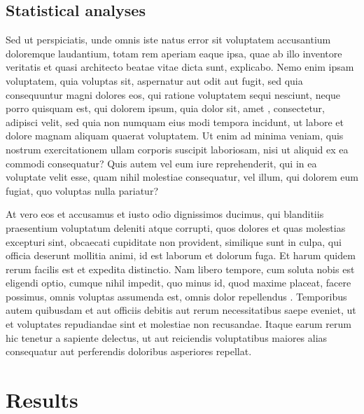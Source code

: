 \documentclass[a4paper,11pt,twoside]{article}
\begin{document}
\subsection*{Statistical analyses}

Sed ut perspiciatis, unde omnis iste natus error sit voluptatem accusantium
doloremque laudantium, totam rem aperiam eaque ipsa, quae ab illo inventore
veritatis et quasi architecto beatae vitae dicta sunt, explicabo. Nemo enim
ipsam voluptatem, quia voluptas sit, aspernatur aut odit aut fugit, sed quia
consequuntur magni dolores eos, qui ratione voluptatem sequi nesciunt, neque
porro quisquam est, qui dolorem ipsum, quia dolor sit, amet
\citep{Ray_2005_Bk,Looijen_1998_PhD}, consectetur, adipisci velit, sed quia non
numquam eius modi tempora incidunt, ut labore et dolore magnam aliquam quaerat
voluptatem. Ut enim ad minima veniam, quis nostrum exercitationem ullam corporis
suscipit laboriosam, nisi ut aliquid ex ea commodi consequatur? Quis autem vel
eum iure reprehenderit, qui in ea voluptate velit esse, quam nihil molestiae
consequatur, vel illum, qui dolorem eum fugiat, quo voluptas nulla pariatur?

At vero eos et accusamus et iusto odio dignissimos ducimus, qui blanditiis praesentium
voluptatum deleniti atque corrupti, quos dolores et quas molestias excepturi sint,
obcaecati cupiditate non provident, similique sunt in culpa, qui officia deserunt mollitia
animi, id est laborum et dolorum fuga. Et harum quidem rerum facilis est et expedita
distinctio. Nam libero tempore, cum soluta nobis est eligendi optio, cumque nihil impedit,
quo minus id, quod maxime placeat, facere possimus, omnis voluptas assumenda est, omnis
dolor repellendus \citep{Gibeau_1998}. Temporibus autem quibusdam et aut officiis debitis
aut rerum necessitatibus saepe eveniet, ut et voluptates repudiandae sint et molestiae non
recusandae. Itaque earum rerum hic tenetur a sapiente delectus, ut aut reiciendis
voluptatibus maiores alias consequatur aut perferendis doloribus asperiores repellat.

\section*{Results}
\end{document}
